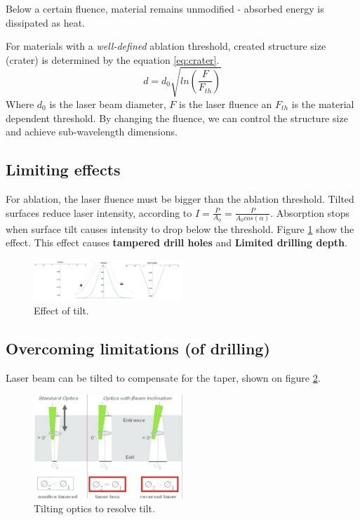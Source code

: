 Below a certain fluence, material remains unmodified - absorbed energy is dissipated as heat. 

For materials with a \textit{well-defined} ablation threshold, created structure size (crater) is determined by the 
equation \ref{eq:crater}.
\begin{equation}
    d = d_0 \sqrt{ln(\frac{F}{F_{th}})}
    \label{eq:crater}
\end{equation}
Where $d_0$ is the laser beam diameter, $F$ is the laser fluence an $F_{th}$ is the material dependent 
threshold. By changing the fluence, we can control the structure size and achieve sub-wavelength dimensions.

\subsection{Limiting effects}
For ablation, the laser fluence must be bigger than the ablation threshold. 
Tilted surfaces reduce laser intensity, according to $I = \frac{P}{A_0} = \frac{P}{A_0 cos(\alpha)}$.
Absorption stops when surface tilt causes intensity to drop below the threshold. Figure \ref{fig:atilted}
show the effect. This effect causes \textbf{tampered drill holes} and \textbf{Limited drilling depth}.


\begin{figure}[h!]
    \centering
    \includegraphics[width=0.5\textwidth]{slike/atillt.png}
    \caption{Effect of tilt.\sln}
    \label{fig:atilted}
\end{figure}

\subsection{Overcoming limitations (of drilling)}

Laser beam can be tilted to compensate for the taper, shown on figure \ref{fig:tiltlim}.
\begin{figure}[h!]
    \centering
    \includegraphics[width=0.5\textwidth]{slike/taper.png}
    \caption{Tilting optics to resolve tilt.\sln}
    \label{fig:tiltlim}
\end{figure}

